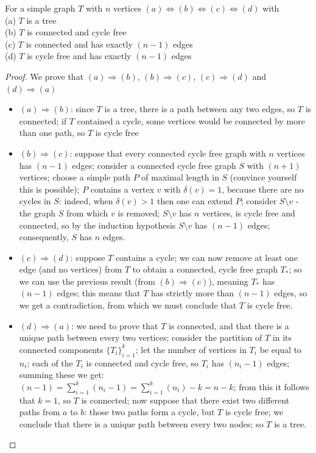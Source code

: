 \begin{theorem}
For a simple graph $T$ with $n$ vertices
 $(a) \Leftrightarrow
  (b) \Leftrightarrow (c) \Leftrightarrow (d)$ with \\[2mm]
(a) $T$ is a tree\\
(b) $T$ is connected and cycle free\\
(c) $T$ is connected and has exactly $(n-1)$ edges\\
(d) $T$ is cycle free and has exactly $(n-1)$ edges
\end{theorem}
\begin{proof} We prove that $(a) \Rightarrow (b)$, $(b) \Rightarrow
(c)$, $(c) \Rightarrow (d)$ and $(d) \Rightarrow (a)$
\begin{itemize}
\item $(a) \Rightarrow (b)$: since $T$ is a tree, there is a path
between any two edges, so $T$ is connected; if $T$ contained a
cycle, some vertices would be connected by more than one path, so $T$
is cycle free
\item $(b) \Rightarrow (c)$:
{ suppose that every connected cycle free graph with $n$ vertices has
$(n-1)$ edges; consider a connected cycle free graph $S$ with $(n+1)$
vertices; choose a simple path $P$ of maximal length in $S$
(convince yourself this is possible); $P$ contains a vertex $v$ with
$\delta(v) = 1$, because there are no cycles in $S$: indeed, when
$\delta(v) > 1$ then one can extend $P$; consider $S \setminus v$ -
the graph $S$ from which $v$ is removed; $S \setminus v$ has $n$
vertices, is cycle free and connected, so by the induction hypothesis $S \setminus v$
has $(n-1)$ edges; consequently, $S$ has $n$ edges.}\vspace{1.5em}

\item $(c) \Rightarrow (d)$: suppose $T$ contains a cycle; we can now
remove at least one edge (and no vertices) from $T$ to obtain a
connected, cycle free graph $T_{*}$; so we can use the previous result
(from $(b) \Rightarrow (c)$), meaning $T_{*}$ has $(n-1)$ edges; this
means that $T$ has strictly more than $(n-1)$ edges, so we get a
contradiction, from which we must conclude that $T$ is cycle free.

\item $(d) \Rightarrow (a)$:
we need to prove that $T$ is connected, and that there is a unique
path between every two vertices; consider the partition of $T$ in its
connected components $\{T_{i}\}_{i=1}^{k}$; let the number of vertices
in $T_{i}$ be equal to $n_{i}$; each of the $T_{i}$ is connected and
cycle free, so $T_{i}$ has $(n_{i}-1)$ edges; summing these we get:
$(n-1) = \sum_{i=1}^{k} (n_{i}-1) = \sum_{i=1}^{k} (n_{i}) - k = n - k$;
from this it follows that $k=1$, so $T$ is connected; now suppose that
there exist two different paths from $a$ to $b$: those two paths form
a cycle, but $T$ is cycle free; we conclude that there is a unique
path between every two nodes; so $T$ is a tree.\vspace{-2em}


\end{itemize}
\end{proof}
